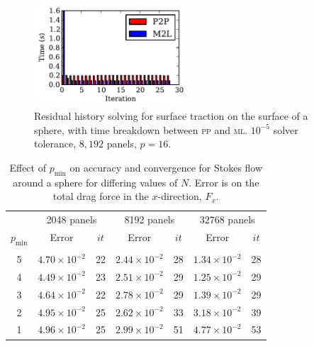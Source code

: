\documentclass[final,leqno,]{siamltex1213}
\newcommand{\mtol}{\textsc{m}\texttwooldstyle\textsc{l}\xspace} %
\newcommand{\ptop}{\textsc{p}\texttwooldstyle\textsc{p}\xspace} %
\newcommand{\pmin}{p_{\text{min}}}
\begin{document}
\begin{figure}[h]
\begin{center}
	\includegraphics[natwidth=3in,natheight=2in,width=0.5\textwidth]{StokesSolveBreakdown.pdf}
	\caption{Residual history solving for surface traction on the surface of a sphere, with time breakdown between {\ptop} and {\mtol}. $10^{-5}$ solver tolerance, $8,192$ panels, $p=16$.}
	\label{fig:stokes_relaxation_breakdown}
\end{center}
\end{figure}



\begin{table}[ht]
\footnotesize
\begin{center}
\begin{tabular}{c|cc|cc|cc}
  & \multicolumn{2}{c|}{2048 panels} & \multicolumn{2}{c|}{8192 panels} & \multicolumn{2}{c}{32768 panels} \\
 $\pmin$ & Error & $it$ & Error & $it$ & Error & $it$ \\ \hline
  & & & & & & \\
 5 & $4.70\times 10^{-2}$ & 22 & $2.44\times 10^{-2}$ & 28 & $1.34\times 10^{-2}$ & 28 \\
 4 & $4.49\times 10^{-2}$ & 23 & $2.51\times 10^{-2}$ & 29 & $1.25\times 10^{-2}$ & 29 \\
 3 & $4.64\times 10^{-2}$ & 22 & $2.78\times 10^{-2}$ & 29 & $1.39\times 10^{-2}$ & 29 \\
 2 & $4.95\times 10^{-2}$ & 25 & $2.62\times 10^{-2}$ & 33 & $3.18\times 10^{-2}$ & 39 \\
 1 & $4.96\times 10^{-2}$ & 25 & $2.99\times 10^{-2}$ & 51 & $4.77\times 10^{-2}$ & 53 
\end{tabular}
\end{center}
\caption{Effect of $p_{\text{min}}$ on accuracy and convergence for Stokes flow around a sphere for differing values of $N$. Error is on the total drag force in the $x$-direction, $F_x$.}
\label{tab:stokes_min_p}
\end{table}%
\end{document}

